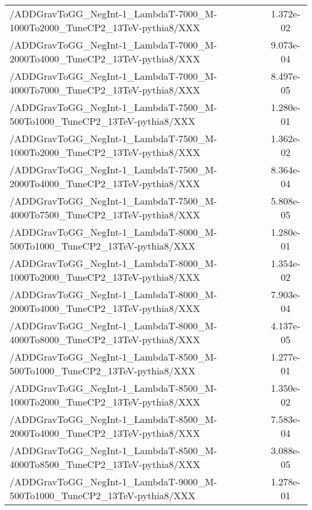 \begin{landscape}
\begin{table}[!htbp]
\begin{tabular}{lc}
       /ADDGravToGG\_NegInt-1\_LambdaT-7000\_M-1000To2000\_TuneCP2\_13TeV-pythia8/XXX &  1.372e-02\\
       /ADDGravToGG\_NegInt-1\_LambdaT-7000\_M-2000To4000\_TuneCP2\_13TeV-pythia8/XXX &  9.073e-04\\
       /ADDGravToGG\_NegInt-1\_LambdaT-7000\_M-4000To7000\_TuneCP2\_13TeV-pythia8/XXX &  8.497e-05\\
       /ADDGravToGG\_NegInt-1\_LambdaT-7500\_M-500To1000\_TuneCP2\_13TeV-pythia8/XXX &  1.280e-01\\
       /ADDGravToGG\_NegInt-1\_LambdaT-7500\_M-1000To2000\_TuneCP2\_13TeV-pythia8/XXX &  1.362e-02\\
       /ADDGravToGG\_NegInt-1\_LambdaT-7500\_M-2000To4000\_TuneCP2\_13TeV-pythia8/XXX &  8.364e-04\\
       /ADDGravToGG\_NegInt-1\_LambdaT-7500\_M-4000To7500\_TuneCP2\_13TeV-pythia8/XXX &  5.808e-05\\
       /ADDGravToGG\_NegInt-1\_LambdaT-8000\_M-500To1000\_TuneCP2\_13TeV-pythia8/XXX &  1.280e-01\\
       /ADDGravToGG\_NegInt-1\_LambdaT-8000\_M-1000To2000\_TuneCP2\_13TeV-pythia8/XXX &  1.354e-02\\
       /ADDGravToGG\_NegInt-1\_LambdaT-8000\_M-2000To4000\_TuneCP2\_13TeV-pythia8/XXX &  7.903e-04\\
       /ADDGravToGG\_NegInt-1\_LambdaT-8000\_M-4000To8000\_TuneCP2\_13TeV-pythia8/XXX &  4.137e-05\\
       /ADDGravToGG\_NegInt-1\_LambdaT-8500\_M-500To1000\_TuneCP2\_13TeV-pythia8/XXX &  1.277e-01\\
       /ADDGravToGG\_NegInt-1\_LambdaT-8500\_M-1000To2000\_TuneCP2\_13TeV-pythia8/XXX &  1.350e-02\\
       /ADDGravToGG\_NegInt-1\_LambdaT-8500\_M-2000To4000\_TuneCP2\_13TeV-pythia8/XXX &  7.583e-04\\
       /ADDGravToGG\_NegInt-1\_LambdaT-8500\_M-4000To8500\_TuneCP2\_13TeV-pythia8/XXX &  3.088e-05\\
       /ADDGravToGG\_NegInt-1\_LambdaT-9000\_M-500To1000\_TuneCP2\_13TeV-pythia8/XXX &  1.278e-01\\


       \hline \hline
       \end{tabular}
       \label{table:ADD_signal_samples_xsec}
\end{table}
\end{landscape}

